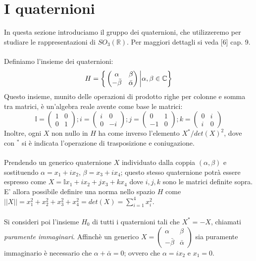 \documentclass[12pt,a4paper]{report}
\theoremstyle{definition}
\theoremstyle{Theorem}
\theoremstyle{definition}
\theoremstyle{definition}
\theoremstyle{definition}
\begin{document}
\section{I quaternioni}
In questa sezione introduciamo il gruppo dei quaternioni, che utilizzeremo per studiare le rappresentazioni di $SO_3(\mathbb{R})$. Per maggiori dettagli si veda [6] cap. 9.\\
\\
Definiamo l'insieme dei quaternioni:
$$H=\bigg{\{}
\begin{pmatrix}
	\alpha & \beta \\
	-\bar{\beta} & \bar{\alpha}
\end{pmatrix}
\bigg{\rvert}\alpha,\beta\in \mathbb{C}
\bigg{\}}$$
Questo insieme, munito delle operazioni di prodotto righe per colonne e somma tra matrici, è un'algebra reale avente come base le matrici:
$$\mathbb{I}=\begin{pmatrix}
	1 & 0 \\
	0 & 1
\end{pmatrix};
i=\begin{pmatrix}
	i & 0 \\
	0 & -i
\end{pmatrix};
j=\begin{pmatrix}
	0 & 1 \\
	-1 & 0
\end{pmatrix};
k=\begin{pmatrix}
	0 & i \\
	i & 0
\end{pmatrix}$$
Inoltre, ogni $X$ non nullo in $H$ ha come inverso l'elemento $X^*/det(X)^2$, dove con $^*$ si è indicata l'operazione di trasposizione e coniugazione.\\
\\
Prendendo un generico quaternione $X$ individuato dalla coppia $(\alpha,\beta)$ e sostituendo $\alpha=x_1+ix_2$, $\beta=x_3+ix_4$; questo stesso quaternione potrà essere espresso come $X=\mathbb{I}x_1+ix_2+jx_3+kx_4$ dove $i,j,k$ sono le matrici definite sopra. E' allora possibile definire una norma nello spazio $H$ come $||X||=x_1^2+x_2^2+x_3^2+x_4^2=det(X)=\sum_{i=1}^{4}x_i^2$.\\
\\
Si consideri poi l'insieme $H_0$ di tutti i quaternioni tali che $X^*=-X$, chiamati \textit{puramente immaginari}. Affinchè un generico $X=\begin{pmatrix}
	\alpha & \beta \\
	-\bar{\beta} & \bar{\alpha}
\end{pmatrix}$ sia puramente immaginario è necessario che $\alpha+\bar{\alpha}=0$; ovvero che $\alpha=ix_2$ e $x_1=0$.\\
\end{document}
